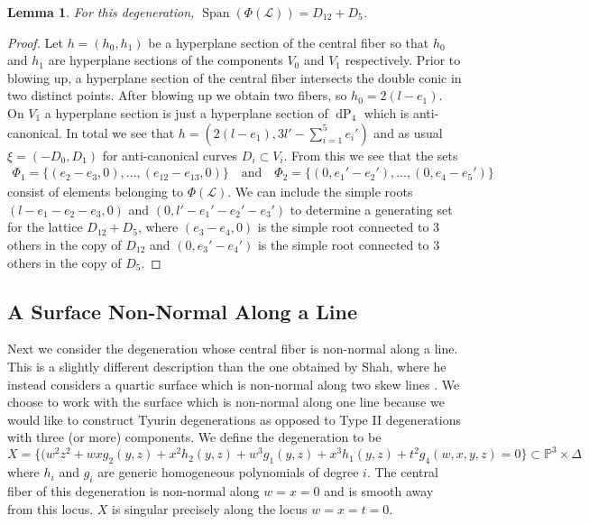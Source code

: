 \documentclass[a4paper]{amsart}
\theoremstyle{definition}
\theoremstyle{plain}
\newtheorem{lemma}[defn]{Lemma}
\theoremstyle{remark}
\newcommand{\PS}{\mathbb{P}}
\begin{document}
\begin{lemma}
For this degeneration, $\operatorname{Span}(\Phi(\mathscr{L})) = D_{12}+D_5$.
\end{lemma}

\begin{proof}
Let $h=(h_0,h_1)$ be a hyperplane section of the central fiber so that $h_0$ and $h_1$ are hyperplane sections of the components $V_0$ and  $V_1$ respectively. Prior to blowing up, a hyperplane section of the central fiber intersects the double conic in two distinct points. After blowing up we obtain two fibers, so $h_0= 2(l-e_1)$. On $V_1$ a hyperplane section is just a hyperplane section of $\operatorname{dP}_4$ which is anti-canonical. In total we see that $h = (2(l-e_1), 3l'-\sum_{i=1}^5e_i')$ and as usual $\xi = (-D_0,D_1)$ for anti-canonical curves $D_i \subset V_i$. From this we see that the sets
\begin{align*}
\Phi_1 = \{(e_2-e_3,0),\dots,(e_{12}-e_{13},0)\} \quad \text{and} \quad \Phi_2 = \{(0,e_{1}'-e_{2}'),\dots,(0, e_{4}-e_{5}')\}    
\end{align*}
consist of elements belonging to $\Phi(\mathscr{L})$. We can include the simple roots $(l-e_1-e_2-e_3,0)$ and $(0,l'-e_1'-e_2'-e_3')$ to determine a generating set for the lattice $D_{12}+D_5$, where $(e_3-e_4,0)$ is the simple root connected to $3$ others in the copy of $D_{12}$ and $(0,e_3'-e_4')$ is the simple root connected to $3$ others in the copy of $D_5$.
\end{proof}

\subsection{A Surface Non-Normal Along a Line}\label{sect:non-normal along line}
Next we consider the degeneration whose central fiber is non-normal along a line. This is a slightly different description than the one obtained by Shah, where he instead considers a quartic surface which is non-normal along two skew lines \cite[SS-3]{Shah81}. We choose to work with the surface which is non-normal along one line because we would like to construct Tyurin degenerations as opposed to Type II degenerations with three (or more) components. We define the degeneration to be
$$X = \{(w^2z^2+wxg_2(y,z)+x^2h_2(y,z)+w^3g_1(y,z)+x^3h_1(y,z)+t^2g_4(w,x,y,z)=0 \} \subset \PS^3\times \Delta$$
where $h_i$ and $g_i$ are generic homogeneous polynomials of degree $i$. The central fiber of this degeneration is non-normal along $w=x=0$ and is smooth away from this locus. $X$ is singular precisely along the locus $w=x=t=0$.
\end{document}
